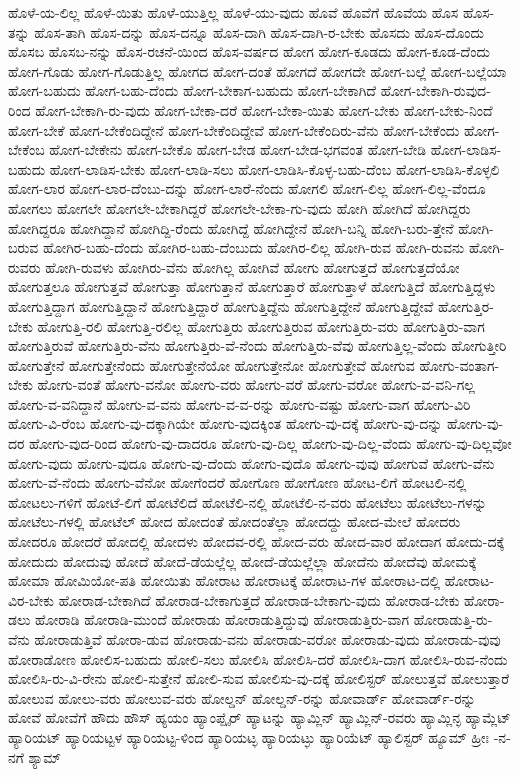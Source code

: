 {ಹೊಳೆ-ಯ-ಲಿಲ್ಲ
ಹೊಳೆ-ಯಿತು
ಹೊಳೆ-ಯುತ್ತಿಲ್ಲ
ಹೊಳೆ-ಯು-ವುದು
ಹೊವೆ
ಹೊವೆಗೆ
ಹೊವೆಯ
ಹೊಸ
ಹೊಸ-ತನ್ನು
ಹೊಸ-ತಾಗಿ
ಹೊಸ-ದನ್ನು
ಹೊಸ-ದನ್ನೂ
ಹೊಸ-ದಾಗಿ
ಹೊಸ-ದಾಗಿ-ರ-ಬೇಕು
ಹೊಸದು
ಹೊಸ-ದೊಂದು
ಹೊಸಬ
ಹೊಸಬ-ನನ್ನು
ಹೊಸ-ರಚನೆ-ಯಿಂದ
ಹೊಸ-ವರ್ಷದ
ಹೋಗ
ಹೋಗ-ಕೂಡದು
ಹೋಗ-ಕೂಡ-ದೆಂದು
ಹೋಗ-ಗೊಡು
ಹೋಗ-ಗೊಡುತ್ತಿಲ್ಲ
ಹೋಗದ
ಹೋಗ-ದಂತೆ
ಹೋಗದೆ
ಹೋಗದೇ
ಹೋಗ-ಬಲ್ಲೆ
ಹೋಗ-ಬಲ್ಲೆಯಾ
ಹೋಗ-ಬಹುದು
ಹೋಗ-ಬಹು-ದೆಂದು
ಹೋಗ-ಬೇಕಾಗ-ಬಹುದು
ಹೋಗ-ಬೇಕಾಗಿದೆ
ಹೋಗ-ಬೇಕಾಗಿ-ರುವುದ-ರಿಂದ
ಹೋಗ-ಬೇಕಾಗಿ-ರು-ವುದು
ಹೋಗ-ಬೇಕಾ-ದರೆ
ಹೋಗ-ಬೇಕಾ-ಯಿತು
ಹೋಗ-ಬೇಕು
ಹೋಗ-ಬೇಕು-ನಿಂದೆ
ಹೋಗ-ಬೇಕೆ
ಹೋಗ-ಬೇಕೆಂದಿದ್ದೇನೆ
ಹೋಗ-ಬೇಕೆಂದಿದ್ದೇವೆ
ಹೋಗ-ಬೇಕೆಂದಿರು-ವೆನು
ಹೋಗ-ಬೇಕೆಂದು
ಹೋಗ-ಬೇಕೆಂಬ
ಹೋಗ-ಬೇಕೇನು
ಹೋಗ-ಬೇಕೊ
ಹೋಗ-ಬೇಡ
ಹೋಗ-ಬೇಡ-ಭಗವಂತ
ಹೋಗ-ಬೇಡಿ
ಹೋಗ-ಲಾಡಿಸ-ಬಹುದು
ಹೋಗ-ಲಾಡಿಸ-ಬೇಕು
ಹೋಗ-ಲಾಡಿ-ಸಲು
ಹೋಗ-ಲಾಡಿಸಿ-ಕೊಳ್ಳ-ಬಹು-ದೆಂಬ
ಹೋಗ-ಲಾಡಿಸಿ-ಕೊಳ್ಳಲಿ
ಹೋಗ-ಲಾರ
ಹೋಗ-ಲಾರ-ದೆಂಬು-ದನ್ನು
ಹೋಗ-ಲಾರೆ-ನೆಂದು
ಹೋಗಲಿ
ಹೋಗ-ಲಿಲ್ಲ
ಹೋಗ-ಲಿಲ್ಲ-ವೆಂದೂ
ಹೋಗಲು
ಹೋಗಲೇ
ಹೋಗಲೇ-ಬೇಕಾಗಿದ್ದರೆ
ಹೋಗಲೇ-ಬೇಕಾ-ಗು-ವುದು
ಹೋಗಿ
ಹೋಗಿದೆ
ಹೋಗಿದ್ದರು
ಹೋಗಿದ್ದರೂ
ಹೋಗಿದ್ದಾನೆ
ಹೋಗಿದ್ದಿ-ರೆಂದು
ಹೋಗಿದ್ದೆ
ಹೋಗಿದ್ದೇನೆ
ಹೋಗಿ-ಬನ್ನಿ
ಹೋಗಿ-ಬರು-ತ್ತೇನೆ
ಹೋಗಿ-ಬರುವ
ಹೋಗಿರ-ಬಹು-ದೆಂದು
ಹೋಗಿರ-ಬಹು-ದೆಂಬುದು
ಹೋಗಿರ-ಲಿಲ್ಲ
ಹೋಗಿ-ರುವ
ಹೋಗಿ-ರುವನು
ಹೋಗಿ-ರುವರು
ಹೋಗಿ-ರುವಳು
ಹೋಗಿರು-ವೆನು
ಹೋಗಿಲ್ಲ
ಹೋಗಿವೆ
ಹೋಗು
ಹೋಗುತ್ತದೆ
ಹೋಗುತ್ತದೆಯೋ
ಹೋಗುತ್ತಲೂ
ಹೋಗುತ್ತವೆ
ಹೋಗುತ್ತಾ
ಹೋಗುತ್ತಾನೆ
ಹೋಗುತ್ತಾರೆ
ಹೋಗುತ್ತಾಳೆ
ಹೋಗುತ್ತಿದೆ
ಹೋಗುತ್ತಿದ್ದಳು
ಹೋಗುತ್ತಿದ್ದಾಗ
ಹೋಗುತ್ತಿದ್ದಾನೆ
ಹೋಗುತ್ತಿದ್ದಾರೆ
ಹೋಗುತ್ತಿದ್ದೆನು
ಹೋಗುತ್ತಿದ್ದೇನೆ
ಹೋಗುತ್ತಿದ್ದೇವೆ
ಹೋಗುತ್ತಿರ-ಬೇಕು
ಹೋಗುತ್ತಿ-ರಲಿ
ಹೋಗುತ್ತಿ-ರಲಿಲ್ಲ
ಹೋಗುತ್ತಿರು
ಹೋಗುತ್ತಿರುವ
ಹೋಗುತ್ತಿರು-ವರು
ಹೋಗುತ್ತಿರು-ವಾಗ
ಹೋಗುತ್ತಿರುವೆ
ಹೋಗುತ್ತಿರು-ವೆನು
ಹೋಗುತ್ತಿರು-ವೆ-ನೆಂದು
ಹೋಗುತ್ತಿರು-ವೆವು
ಹೋಗುತ್ತಿಲ್ಲ-ವೆಂದು
ಹೋಗುತ್ತೀರಿ
ಹೋಗುತ್ತೇನೆ
ಹೋಗುತ್ತೇನೆಂದು
ಹೋಗುತ್ತೇನೆಯೋ
ಹೋಗುತ್ತೇನೋ
ಹೋಗುತ್ತೇವೆ
ಹೋಗುವ
ಹೋಗು-ವಂತಾಗ-ಬೇಕು
ಹೋಗು-ವಂತೆ
ಹೋಗು-ವನೋ
ಹೋಗು-ವರು
ಹೋಗು-ವರೆ
ಹೋಗು-ವರೋ
ಹೋಗು-ವ-ವನಿ-ಗಲ್ಲ
ಹೋಗು-ವ-ವನಿದ್ದಾನೆ
ಹೋಗು-ವ-ವನು
ಹೋಗು-ವ-ವ-ರನ್ನು
ಹೋಗು-ವಷ್ಟು
ಹೋಗು-ವಾಗ
ಹೋಗು-ವಿರಿ
ಹೋಗು-ವಿ-ರೆಂಬ
ಹೋಗು-ವು-ದಕ್ಕಾಗಿಯೇ
ಹೋಗು-ವುದಕ್ಕಿಂತ
ಹೋಗು-ವು-ದಕ್ಕೆ
ಹೋಗು-ವು-ದನ್ನು
ಹೋಗು-ವು-ದರ
ಹೋಗು-ವುದ-ರಿಂದ
ಹೋಗು-ವು-ದಾದರೂ
ಹೋಗು-ವು-ದಿಲ್ಲ
ಹೋಗು-ವು-ದಿಲ್ಲ-ವೆಂದು
ಹೋಗು-ವು-ದಿಲ್ಲವೋ
ಹೋಗು-ವುದು
ಹೋಗು-ವುದೂ
ಹೋಗು-ವು-ದೆಂದು
ಹೋಗು-ವುದೊ
ಹೋಗು-ವುವು
ಹೋಗುವೆ
ಹೋಗು-ವೆನು
ಹೋಗು-ವೆ-ನೆಂದು
ಹೋಗು-ವೆನೋ
ಹೋಗೆಂದರೆ
ಹೋಗೊಣ
ಹೋಗೋಣ
ಹೋಟ-ಲಿಗೆ
ಹೋಟಲಿ-ನಲ್ಲಿ
ಹೋಟಲು-ಗಳಿಗೆ
ಹೋಟೆ-ಲಿಗೆ
ಹೋಟೆಲಿದೆ
ಹೋಟೆಲಿ-ನಲ್ಲಿ
ಹೋಟೆಲಿ-ನ-ವರು
ಹೋಟೆಲು
ಹೋಟೆಲು-ಗಳನ್ನು
ಹೋಟೆಲು-ಗಳಲ್ಲಿ
ಹೋಟೆಲ್
ಹೋದ
ಹೋದಂತೆ
ಹೋದಂತೆಲ್ಲಾ
ಹೋದದ್ದು
ಹೋದ-ಮೇಲೆ
ಹೋದರು
ಹೋದರೂ
ಹೋದರೆ
ಹೋದಲ್ಲಿ
ಹೋದಳು
ಹೋದವ-ರಲ್ಲಿ
ಹೋದ-ವರು
ಹೋದ-ವಾರ
ಹೋದಾಗ
ಹೋದು-ದಕ್ಕೆ
ಹೋದುದು
ಹೋದುವು
ಹೋದೆ
ಹೋದೆ-ಡೆಯಲ್ಲೆಲ್ಲ
ಹೋದೆ-ಡೆಯಲ್ಲೆಲ್ಲಾ
ಹೋದೆನು
ಹೋದೆವು
ಹೋಮಕ್ಕೆ
ಹೋಮಾ
ಹೋಮಿಯೋ-ಪತಿ
ಹೋಯಿತು
ಹೋರಾಟ
ಹೋರಾಟಕ್ಕೆ
ಹೋರಾಟ-ಗಳ
ಹೋರಾಟ-ದಲ್ಲಿ
ಹೋರಾಟ-ವಿರ-ಬೇಕು
ಹೋರಾಡ-ಬೇಕಾಗಿದೆ
ಹೋರಾಡ-ಬೇಕಾಗುತ್ತದೆ
ಹೋರಾಡ-ಬೇಕಾಗು-ವುದು
ಹೋರಾಡ-ಬೇಕು
ಹೋರಾ-ಡಲು
ಹೋರಾಡಿ
ಹೋರಾಡಿ-ಮುಂದೆ
ಹೋರಾಡು
ಹೋರಾಡುತ್ತಿದ್ದುವು
ಹೋರಾಡುತ್ತಿರು-ವಾಗ
ಹೋರಾಡುತ್ತಿ-ರು-ವೆನು
ಹೋರಾಡುತ್ತಿವೆ
ಹೋರಾ-ಡುವ
ಹೋರಾಡು-ವನು
ಹೋರಾಡು-ವರೋ
ಹೋರಾಡು-ವುದು
ಹೋರಾಡು-ವುವು
ಹೋರಾಡೋಣ
ಹೋಲಿಸ-ಬಹುದು
ಹೋಲಿ-ಸಲು
ಹೋಲಿಸಿ
ಹೋಲಿಸಿ-ದರೆ
ಹೋಲಿಸಿ-ದಾಗ
ಹೋಲಿಸಿ-ರುವ-ನೆಂದು
ಹೋಲಿಸಿ-ರು-ವಿ-ರೇನು
ಹೋಲಿ-ಸುತ್ತೇನೆ
ಹೋಲಿ-ಸುವ
ಹೋಲಿಸು-ವು-ದಕ್ಕೆ
ಹೋಲಿಸ್ಟರ್
ಹೋಲುತ್ತವೆ
ಹೋಲುತ್ತಾರೆ
ಹೋಲುವ
ಹೋಲು-ವರು
ಹೋಲುವ-ವರು
ಹೋಲ್ಡನ್
ಹೋಲ್ಡನ್-ರನ್ನು
ಹೋವಾರ್ಡ್
ಹೋವಾರ್ಡ್-ರನ್ನು
ಹೋವೆ
ಹೋವೆಗೆ
ಹೌದು
ಹೌಸ್
ಹ್ಯಯಂ
ಹ್ಯಾಂಪ್ಷೈರ್
ಹ್ಯಾಟನ್ನು
ಹ್ಯಾಮ್ಲಿನ್
ಹ್ಯಾಮ್ಲಿನ್-ರವರು
ಹ್ಯಾಮ್ಲಿನ್ಳ
ಹ್ಯಾಮ್ಲೆಟ್
ಹ್ಯಾರಿಯಟ್
ಹ್ಯಾರಿಯಟ್ಟಳ
ಹ್ಯಾರಿಯಟ್ಟ-ಳಿಂದ
ಹ್ಯಾರಿಯಟ್ಳ
ಹ್ಯಾರಿಯಟ್ಳು
ಹ್ಯಾರಿಯೆಟ್
ಹ್ಯಾಲಿಸ್ಟರ್
ಹ್ಯೂಮ್
ಹ್ರೀಃ
-ನ-ನಗೆ
ಶ್ಯಾಮ್
}
